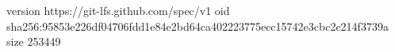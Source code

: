 version https://git-lfs.github.com/spec/v1
oid sha256:95853e226df04706fdd1e84e2bd64ca402223775ecc15742e3cbc2c214f3739a
size 253449
